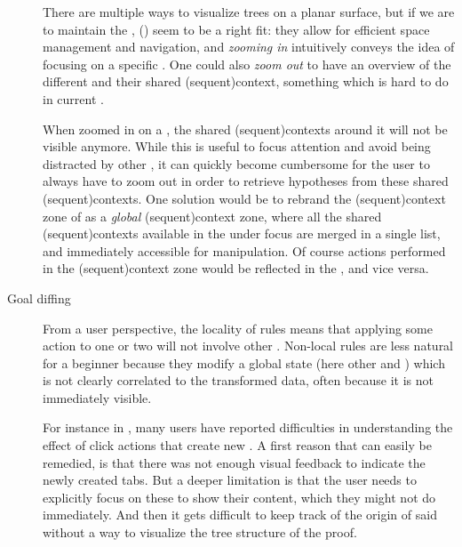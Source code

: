 \begin{scope}
\begin{description}
    There are multiple ways to visualize trees on a planar surface, but if we
    are to maintain the  ,  () seem to be a right fit: they allow for efficient
    space management and navigation, and \emph{zooming in} intuitively conveys
    the idea of focusing on a specific . One could also \emph{zoom
    out} to have an overview of the different  and their shared
    \kl(sequent){context}, something which is hard to do in current .
    
    When zoomed in on a , the shared \kl(sequent){contexts} around
    it will not be visible anymore. While this is useful to focus attention and
    avoid being distracted by other , it can quickly become
    cumbersome for the user to always have to zoom out in order to retrieve
    hypotheses from these shared \kl(sequent){contexts}. One solution would be
    to rebrand the \kl(sequent){context} zone of  as a \emph{global}
    \kl(sequent){context} zone, where all the shared \kl(sequent){contexts}
    available in the  under focus are merged in a single list, and
    immediately accessible for manipulation. Of course actions performed in the
    \kl(sequent){context} zone would be reflected in the , and
    vice versa.

  \item[Goal diffing] From a user perspective, the locality of rules
    means that applying some action to one or two  will not involve
    other . Non-local rules are less natural
    for a beginner because they modify a global state (here other  and
    ) which is not clearly correlated to the transformed data,
    often because it is not immediately visible.

    For instance in , many users have reported difficulties in
    understanding the effect of click actions that create new . A first
    reason that can easily be remedied, is that there was not enough visual
    feedback to indicate the newly created tabs. But a deeper limitation is that
    the user needs to explicitly focus on these  to show their content,
    which they might not do immediately. And then it gets difficult to keep
    track of the origin of said  without a way to visualize the tree
    structure of the proof.


\end{description}
\end{scope}
